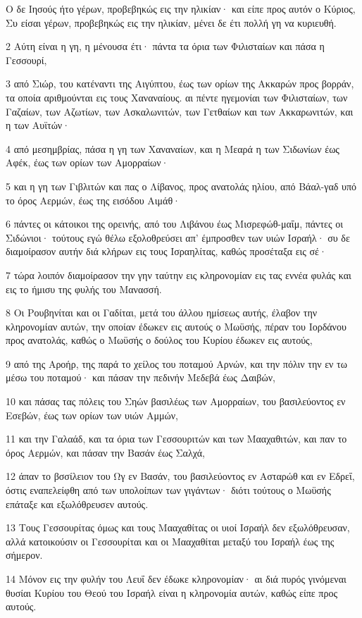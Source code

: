 \par Ο δε Ιησούς ήτο γέρων, προβεβηκώς εις την ηλικίαν· και είπε προς αυτόν ο Κύριος, Συ είσαι γέρων, προβεβηκώς εις την ηλικίαν, μένει δε έτι πολλή γη να κυριευθή.
\par 2 Αύτη είναι η γη, η μένουσα έτι· πάντα τα όρια των Φιλισταίων και πάσα η Γεσσουρί,
\par 3 από Σιώρ, του κατέναντι της Αιγύπτου, έως των ορίων της Ακκαρών προς βορράν, τα οποία αριθμούνται εις τους Χαναναίους. αι πέντε ηγεμονίαι των Φιλισταίων, των Γαζαίων, των Αζωτίων, των Ασκαλωνιτών, των Γετθαίων και των Ακκαρωνιτών, και η των Αυϊτών·
\par 4 από μεσημβρίας, πάσα η γη των Χαναναίων, και η Μεαρά η των Σιδωνίων έως Αφέκ, έως των ορίων των Αμορραίων·
\par 5 και η γη των Γιβλιτών και πας ο Λίβανος, προς ανατολάς ηλίου, από Βάαλ-γαδ υπό το όρος Αερμών, έως της εισόδου Αιμάθ·
\par 6 πάντες οι κάτοικοι της ορεινής, από του Λιβάνου έως Μισρεφώθ-μαΐμ, πάντες οι Σιδώνιοι· τούτους εγώ θέλω εξολοθρεύσει απ' έμπροσθεν των υιών Ισραήλ· συ δε διαμοίρασον αυτήν διά κλήρων εις τους Ισραηλίτας, καθώς προσέταξα εις σέ·
\par 7 τώρα λοιπόν διαμοίρασον την γην ταύτην εις κληρονομίαν εις τας εννέα φυλάς και εις το ήμισυ της φυλής του Μανασσή.
\par 8 Οι Ρουβηνίται και οι Γαδίται, μετά του άλλου ημίσεως αυτής, έλαβον την κληρονομίαν αυτών, την οποίαν έδωκεν εις αυτούς ο Μωϋσής, πέραν του Ιορδάνου προς ανατολάς, καθώς ο Μωϋσής ο δούλος του Κυρίου έδωκεν εις αυτούς,
\par 9 από της Αροήρ, της παρά το χείλος του ποταμού Αρνών, και την πόλιν την εν τω μέσω του ποταμού· και πάσαν την πεδινήν Μεδεβά έως Δαιβών,
\par 10 και πάσας τας πόλεις του Σηών βασιλέως των Αμορραίων, του βασιλεύοντος εν Εσεβών, έως των ορίων των υιών Αμμών,
\par 11 και την Γαλαάδ, και τα όρια των Γεσσουριτών και των Μααχαθιτών, και παν το όρος Αερμών, και πάσαν την Βασάν έως Σαλχά,
\par 12 άπαν το βσσίλειον του Ωγ εν Βασάν, του βασιλεύοντος εν Ασταρώθ και εν Εδρεΐ, όστις εναπελείφθη από των υπολοίπων των γιγάντων· διότι τούτους ο Μωϋσής επάταξε και εξωλόθρευσεν αυτούς.
\par 13 Τους Γεσσουρίτας όμως και τους Μααχαθίτας οι υιοί Ισραήλ δεν εξωλόθρευσαν, αλλά κατοικούσιν οι Γεσσουρίται και οι Μααχαθίται μεταξύ του Ισραήλ έως της σήμερον.
\par 14 Μόνον εις την φυλήν του Λευΐ δεν έδωκε κληρονομίαν· αι διά πυρός γινόμεναι θυσίαι Κυρίου του Θεού του Ισραήλ είναι η κληρονομία αυτών, καθώς είπε προς αυτούς.
